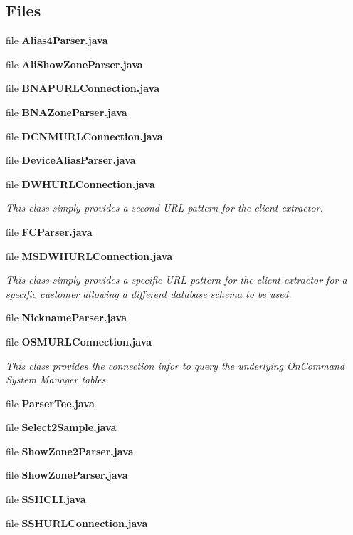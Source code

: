 \subsection*{Files}
\begin{DoxyCompactItemize}
\item 
file {\bf Alias4\+Parser.\+java}
\item 
file {\bf Ali\+Show\+Zone\+Parser.\+java}
\item 
file {\bf B\+N\+A\+P\+U\+R\+L\+Connection.\+java}
\item 
file {\bf B\+N\+A\+Zone\+Parser.\+java}
\item 
file {\bf D\+C\+N\+M\+U\+R\+L\+Connection.\+java}
\item 
file {\bf Device\+Alias\+Parser.\+java}
\item 
file {\bf D\+W\+H\+U\+R\+L\+Connection.\+java}
\begin{DoxyCompactList}\small\item\em This class simply provides a second U\+R\+L pattern for the client extractor. \end{DoxyCompactList}\item 
file {\bf F\+C\+Parser.\+java}
\item 
file {\bf M\+S\+D\+W\+H\+U\+R\+L\+Connection.\+java}
\begin{DoxyCompactList}\small\item\em This class simply provides a specific U\+R\+L pattern for the client extractor for a specific customer allowing a different database schema to be used. \end{DoxyCompactList}\item 
file {\bf Nickname\+Parser.\+java}
\item 
file {\bf O\+S\+M\+U\+R\+L\+Connection.\+java}
\begin{DoxyCompactList}\small\item\em This class provides the connection infor to query the underlying On\+Command System Manager tables. \end{DoxyCompactList}\item 
file {\bf Parser\+Tee.\+java}
\item 
file {\bf Select2\+Sample.\+java}
\item 
file {\bf Show\+Zone2\+Parser.\+java}
\item 
file {\bf Show\+Zone\+Parser.\+java}
\item 
file {\bf S\+S\+H\+C\+L\+I.\+java}
\item 
file {\bf S\+S\+H\+U\+R\+L\+Connection.\+java}

\end{DoxyCompactItemize}
